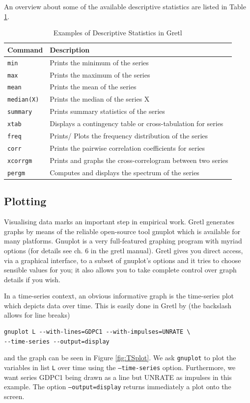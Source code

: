 \documentclass[11pt]{article}
\begin{document}
An overview about some of the available descriptive statistics are listed in Table \ref{tab:descriptive}.

\begin{table}[!h]
	\centering
	\footnotesize
	\begin{tabular}{ll}
		\hline
		Command & Description \\ 
		\hline 
		\texttt{min} & Prints the minimum of the series \\
		\texttt{max} & Prints the maximum of the series \\
		\texttt{mean} & Prints the mean of the series \\
		\texttt{median(X)} & Prints the median of the series X \\
		\texttt{summary} & Prints summary statistics of the series \\
		\texttt{xtab} & Displays a contingency table or cross-tabulation for series\\ 
		\texttt{freq} & Prints/ Plots the frequency distribution of the series \\
		\texttt{corr} & Prints the pairwise correlation coefficients for series\\
		\texttt{xcorrgm} & Prints and graphs the cross-correlogram between two series \\
		\texttt{pergm} & Computes and displays the spectrum of the series \\
		\hline 
	\end{tabular}
	\caption{Examples of Descriptive Statistics in Gretl}
	\label{tab:descriptive}
\end{table}

\subsection{Plotting}
Visualising data marks an important step in empirical work. Gretl generates graphs by means of the reliable open-source tool gnuplot which is available for many platforms. Gnuplot is a very full-featured graphing program with myriad options (for details see ch. 6 in the gretl manual). Gretl gives you direct access, via a graphical interface, to a subset of gnuplot’s options and it tries to choose sensible values for you; it also allows you to take complete control over graph details if you wish.

In a time-series context, an obvious informative graph is the time-series plot which depicts data over time. This is easily done in Gretl by (the backslash allows for line breaks)
\begin{Verbatim}[baselinestretch=0.75, fontsize=\small]
gnuplot L --with-lines=GDPC1 --with-impulses=UNRATE \
--time-series --output=display
\end{Verbatim}
and the graph can be seen in Figure \ref{fig:TSplot}. We ask \texttt{gnuplot} to plot the variables in list \texttt{L} over time using the \texttt{---time-series} option. Furthermore, we want series GDPC1 being drawn as a line but UNRATE as impulses in this example. The option \texttt{---output=display} returns immediately a plot onto the screen.
\end{document}
